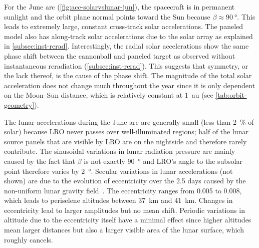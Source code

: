 For the June arc (\cref{fig:acc-solarvslunar-jun}), the spacecraft is in permanent sunlight and the orbit plane normal points toward the Sun because $\beta \approx \qty{90}{\degree}$. This leads to extremely large, constant cross-track solar accelerations. The paneled model also has along-track solar accelerations due to the solar array as explained in \cref{subsec:inst-rerad}. Interestingly, the radial solar accelerations show the same phase shift between the cannonball and paneled target as observed without instantaneous reradiation (\cref{subsec:inst-rerad}). This suggests that symmetry, or the lack thereof, is the cause of the phase shift. The magnitude of the total solar acceleration does not change much throughout the year since it is only dependent on the Moon--Sun distance, which is relatively constant at \qty{1}{\astronomicalunit} (see \cref{tab:orbit-geometry}).

The lunar accelerations during the June arc are generally small (less than \qty{2}{\percent} of solar) because \gls{LRO} never passes over well-illuminated regions; half of the lunar source panels that are visible by \gls{LRO} are on the nightside and therefore rarely contribute. The sinusoidal variations in lunar radiation pressure are mainly caused by the fact that $\beta$ is not exactly \qty{90}{\degree} and \gls{LRO}'s angle to the subsolar point therefore varies by \qty{2}{\degree}. Secular variations in lunar accelerations (not shown) are due to the evolution of eccentricity over the 2.5 days caused by the non-uniform lunar gravity field~\cite{Tooley2010}. The eccentricity ranges from 0.005 to 0.008, which leads to periselene altitudes between \qty{37}{\km} and \qty{41}{\km}. Changes in eccentricity lead to larger amplitudes but no mean shift. Periodic variations in altitude due to the eccentricity itself have a minimal effect since higher altitudes mean larger distances but also a larger visible area of the lunar surface, which roughly cancels.

